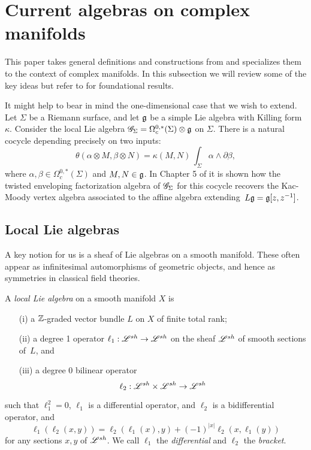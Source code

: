 \section{Current algebras on complex manifolds}

This paper takes general definitions and constructions from \cite{CG1} and specializes them to the context of complex manifolds.
In this subsection we will review some of the key ideas but refer to \cite{CG1} for foundational results.

\begin{rmk}
It might help to bear in mind the one-dimensional case that we wish to extend. 
Let $\Sigma$ be a Riemann surface, and let $\mathfrak g$ be a simple Lie algebra with Killing form $\kappa$.
Consider the local Lie algebra $\mathscr G_\Sigma = \Omega^{0,*}_c(\Sigma) \otimes \mathfrak g$ on $\Sigma$.
There is a natural cocycle depending precisely on two inputs:
\[
\theta( \alpha \otimes M, \beta \otimes N) = \kappa(M,N) \, \int_\Sigma \alpha \wedge \partial \beta  ,
\]
where $\alpha, \beta \in \Omega^{0,*}_c(\Sigma)$ and $M,N \in \mathfrak g$.
In Chapter 5 of \cite{CG1} it is shown how the twisted enveloping factorization algebra of $\mathscr G_\Sigma$ for this cocycle recovers the Kac-Moody vertex algebra associated to the affine algebra extending~$L\mathfrak g = \mathfrak g[z,z^{-1}]$.
\end{rmk}

\subsection{Local Lie algebras}

A key notion for us is a sheaf of Lie algebras on a smooth manifold.
These often appear as infinitesimal automorphisms of geometric objects,
and hence as symmetries in classical field theories.

\begin{dfn} 
A {\em local Lie algebra} on a smooth manifold $X$ is 
\begin{itemize}
\item[(i)] a $\mathbb Z$-graded vector bundle $L$ on $X$ of finite total rank;
\item[(ii)] a degree 1 operator $\ell_1:\mathscr L^{sh} \to \mathscr L^{sh}$ on the sheaf $\mathscr L^{sh}$ of smooth sections of~$L$, and
\item[(iii)] a degree 0 bilinear operator
\[
\ell_2 : \mathscr L^{sh} \times \mathscr L^{sh} \to \mathscr L^{sh}
\]
\end{itemize}
such that $\ell_1^2 = 0$, $\ell_1$ is a differential operator, and $\ell_2$ is a bidifferential operator, and
\[
\ell_1(\ell_2(x,y)) = \ell_2(\ell_1(x), y) + (-1)^{|x|} \ell_2(x, \ell_1(y))
\]
for any sections $x,y$ of $\mathscr L^{sh}$.
We call $\ell_1$ the {\em differential} and $\ell_2$ the {\em bracket}.
\end{dfn}

